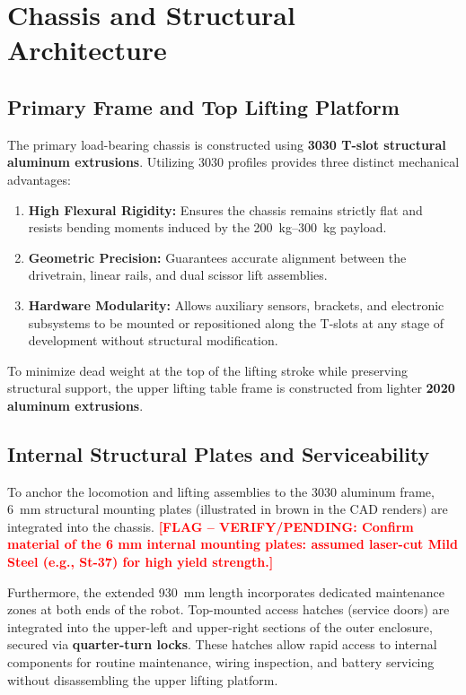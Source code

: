 \documentclass[12pt, a4paper]{report}
\newcommand{\flag}[1]{\textcolor{red}{\textbf{[FLAG -- VERIFY/PENDING: #1]}}}
\begin{document}
\section{Chassis and Structural Architecture}

\subsection{Primary Frame and Top Lifting Platform}
The primary load-bearing chassis is constructed using \textbf{3030 T-slot structural aluminum extrusions}. Utilizing 3030 profiles provides three distinct mechanical advantages:
\begin{enumerate}
    \item \textbf{High Flexural Rigidity:} Ensures the chassis remains strictly flat and resists bending moments induced by the \SIrange{200}{300}{\kilogram} payload.
    \item \textbf{Geometric Precision:} Guarantees accurate alignment between the drivetrain, linear rails, and dual scissor lift assemblies.
    \item \textbf{Hardware Modularity:} Allows auxiliary sensors, brackets, and electronic subsystems to be mounted or repositioned along the T-slots at any stage of development without structural modification.
\end{enumerate}

To minimize dead weight at the top of the lifting stroke while preserving structural support, the upper lifting table frame is constructed from lighter \textbf{2020 aluminum extrusions}.

\subsection{Internal Structural Plates and Serviceability}
To anchor the locomotion and lifting assemblies to the 3030 aluminum frame, \SI{6}{\milli\meter} structural mounting plates (illustrated in brown in the CAD renders) are integrated into the chassis. \flag{Confirm material of the 6 mm internal mounting plates: assumed laser-cut Mild Steel (e.g., St-37) for high yield strength.}

Furthermore, the extended \SI{930}{\milli\meter} length incorporates dedicated maintenance zones at both ends of the robot. Top-mounted access hatches (service doors) are integrated into the upper-left and upper-right sections of the outer enclosure, secured via \textbf{quarter-turn locks}. These hatches allow rapid access to internal components for routine maintenance, wiring inspection, and battery servicing without disassembling the upper lifting platform.
\end{document}
